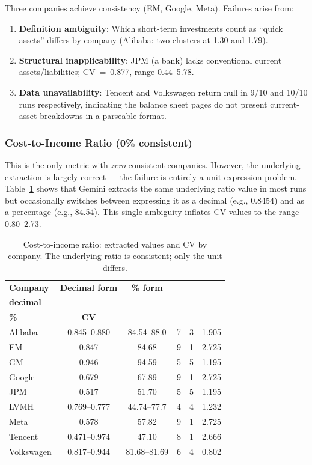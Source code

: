 \documentclass[12pt, a4paper]{article}
\begin{document}
Three companies achieve consistency (EM, Google, Meta).  Failures arise from:
\begin{enumerate}[noitemsep]
  \item \textbf{Definition ambiguity}: Which short-term investments count as
        ``quick assets'' differs by company (Alibaba: two clusters at 1.30
        and 1.79).
  \item \textbf{Structural inapplicability}: JPM (a bank) lacks conventional
        current assets/liabilities; CV~=~0.877, range 0.44--5.78.
  \item \textbf{Data unavailability}: Tencent and Volkswagen return null in
        9/10 and 10/10 runs respectively, indicating the balance sheet pages
        do not present current-asset breakdowns in a parseable format.
\end{enumerate}

\subsubsection{Cost-to-Income Ratio (0\% consistent)}

This is the only metric with \emph{zero} consistent companies.  However, the
underlying extraction is largely correct --- the failure is entirely a
unit-expression problem.  Table~\ref{tab:cti} shows that Gemini extracts
the same underlying ratio value in most runs but occasionally switches between
expressing it as a decimal (e.g., 0.8454) and as a percentage (e.g., 84.54).
This single ambiguity inflates CV values to the range 0.80--2.73.

\begin{table}[H]
\centering
\caption{Cost-to-income ratio: extracted values and CV by company.
         The underlying ratio is consistent; only the unit differs.}
\label{tab:cti}
\begin{tabular}{lccccc}
\toprule
\textbf{Company} &
  \textbf{Decimal form} &
  \textbf{\% form} &
  \makecell{\textbf{Runs as}\\\textbf{decimal}} &
  \makecell{\textbf{Runs as}\\\textbf{\%}} &
  \textbf{CV} \\
\midrule
Alibaba    & 0.845--0.880 & 84.54--88.0  & 7 & 3 & 1.905 \\
EM         & 0.847        & 84.68        & 9 & 1 & 2.725 \\
GM         & 0.946        & 94.59        & 5 & 5 & 1.195 \\
Google     & 0.679        & 67.89        & 9 & 1 & 2.725 \\
JPM        & 0.517        & 51.70        & 5 & 5 & 1.195 \\
LVMH       & 0.769--0.777 & 44.74--77.7  & 4 & 4 & 1.232 \\
Meta       & 0.578        & 57.82        & 9 & 1 & 2.725 \\
Tencent    & 0.471--0.974 & 47.10        & 8 & 1 & 2.666 \\
Volkswagen & 0.817--0.944 & 81.68--81.69 & 6 & 4 & 0.802 \\
\bottomrule
\end{tabular}
\end{table}
\end{document}
